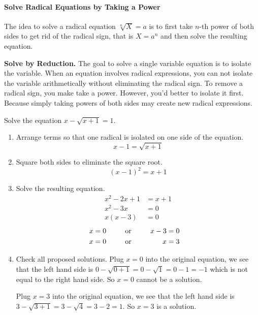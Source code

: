 
\paragraph*{Solve Radical Equations by Taking a Power}
	The idea to solve a radical equation $\sqrt[n]{X}=a$ is to first take $n$-th power of both sides to get rid of the radical sign, that is $X=a^n$ and then solve the resulting equation.

	\begin{trick}\textbf{Solve by Reduction.}
		The goal to solve a single variable equation is to isolate the variable. 
		When an equation involves radical expressions, you can not isolate the variable arithmetically without eliminating the radical sign. To remove a radical sign, you make take a power. However, you'd better to isolate it first. Because simply taking powers of both sides may create new radical expressions.
	\end{trick}

	\begin{example}
		Solve the equation 
		$x-\sqrt{x+1}=1.$
	\end{example}
	\begin{solution}
		\begin{multicols}{2}
			\begin{enumerate}[label={\textbf{\textup{Step \arabic*.}}~}]
				\item Arrange terms so that one radical is isolated on one side of the equation.
				      \[x-1=\sqrt{x+1}\]
				\item Square both sides to eliminate the square root.
				      \[(x-1)^2=x+1\]
				\item Solve the resulting equation.
				      \[
					      \begin{split}
						      x^2-2x+1&=x+1\\
						      x^2-3x&=0\\
						      x(x-3)&=0
					      \end{split}
				      \]
				      \begin{alignat*}{3}
					      x & =0 &  & \ctc{or} & x-3 & =0 \\
					      x & =0 &  & \ctc{or} & x   & =3
				      \end{alignat*}
				\item Check all proposed solutions.
				      Plug $x=0$ into the original equation, we see that the left hand side is  $0-\sqrt{0+1}=0-\sqrt{1}=0-1=-1$ which is not equal to the right hand side. So $x=0$ cannot be a solution.

				      Plug $x=3$ into the original equation, we see that the left hand side is $3-\sqrt{3+1}=3-\sqrt{4}=3-2=1$. So $x=3$ is a solution.
			\end{enumerate}
		\end{multicols}
	\end{solution}

